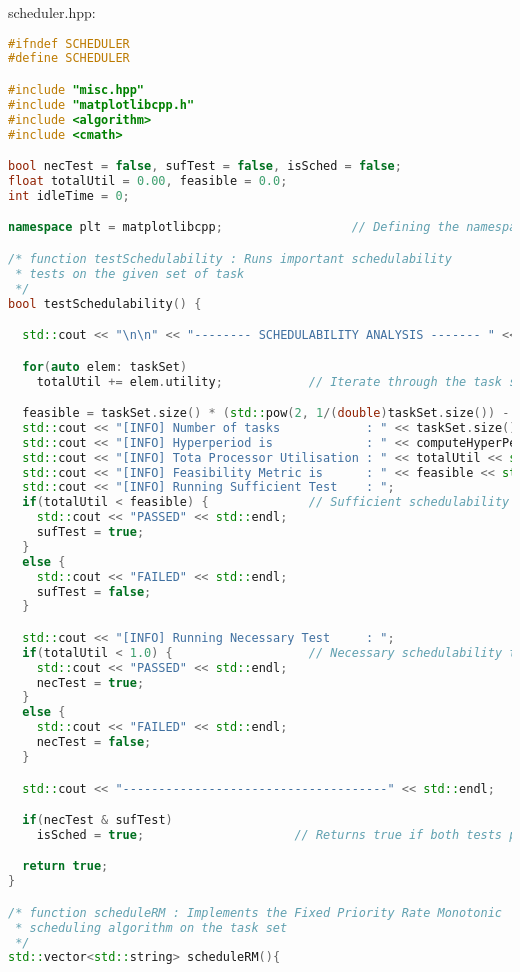 scheduler.hpp:
\begin{lstlisting}[language=C++, frame=single]
#ifndef SCHEDULER
#define SCHEDULER

#include "misc.hpp"
#include "matplotlibcpp.h"
#include <algorithm>
#include <cmath>

bool necTest = false, sufTest = false, isSched = false;
float totalUtil = 0.00, feasible = 0.0;
int idleTime = 0;

namespace plt = matplotlibcpp;                  // Defining the namespace for matplotlib

/* function testSchedulability : Runs important schedulability
 * tests on the given set of task
 */
bool testSchedulability() {

  std::cout << "\n\n" << "-------- SCHEDULABILITY ANALYSIS ------- " << std::endl;

  for(auto elem: taskSet)
    totalUtil += elem.utility;            // Iterate through the task set and compute the total utilisation

  feasible = taskSet.size() * (std::pow(2, 1/(double)taskSet.size()) - 1);
  std::cout << "[INFO] Number of tasks            : " << taskSet.size() << std::endl;
  std::cout << "[INFO] Hyperperiod is             : " << computeHyperPeriod(taskSet) << " time units" << std::endl;
  std::cout << "[INFO] Tota Processor Utilisation : " << totalUtil << std::endl;
  std::cout << "[INFO] Feasibility Metric is      : " << feasible << std::endl;
  std::cout << "[INFO] Running Sufficient Test    : ";
  if(totalUtil < feasible) {              // Sufficient schedulability test
    std::cout << "PASSED" << std::endl;
    sufTest = true;
  }
  else {
    std::cout << "FAILED" << std::endl;
    sufTest = false;
  }

  std::cout << "[INFO] Running Necessary Test     : ";
  if(totalUtil < 1.0) {                   // Necessary schedulability test
    std::cout << "PASSED" << std::endl;
    necTest = true;
  }
  else {
    std::cout << "FAILED" << std::endl;
    necTest = false;
  }

  std::cout << "-------------------------------------" << std::endl;

  if(necTest & sufTest)
    isSched = true;                     // Returns true if both tests pass

  return true;
}

/* function scheduleRM : Implements the Fixed Priority Rate Monotonic
 * scheduling algorithm on the task set
 */
std::vector<std::string> scheduleRM(){


\end{lstlisting}
